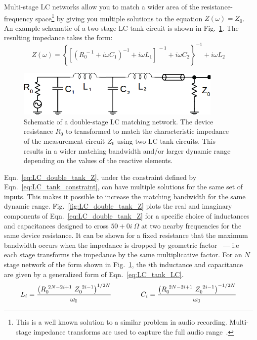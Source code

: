 Multi-stage LC networks allow you to match a wider area of the resistance-frequency space\footnote{This is a well known solution to a similar problem in audio recording. Multi-stage impedance transforms are used to capture the full audio range~\cite{horowitz_art_1989}.} by giving you multiple solutions to the equation $Z(\omega)=Z_0$. An example schematic of a two-stage LC tank circuit is shown in Fig.~\ref{fig:schematic_double_matching}. The resulting impedance takes the form:
\begin{equation}\label{eq:LC_double_tank_Z}
Z(\omega) = \left\lbrace\left[\left(R_0^{~-1}+i\omega C_1\right)^{-1}+i\omega L_1\right]^{~-1}+i\omega C_2\right\rbrace^{-1}+i\omega L_2
\end{equation}
\begin{figure}
\centering
\includegraphics[width=100mm]{figures/Johnson_noise_thermometry/schematic_double_matching}
\caption{Schematic of a double-stage LC matching network. The device resistance $R_0$ to transformed to match the characteristic impedance of the measurement circuit $Z_0$ using two LC tank circuits. This results in a wider matching bandwidth and/or larger dynamic range depending on the values of the reactive elements.}
\label{fig:schematic_double_matching}
\end{figure}
Eqn.~\ref{eq:LC_double_tank_Z}, under the constraint defined by Eqn.~\ref{eq:LC_tank_constraint}, can have multiple solutions for the same set of inputs. This makes it possible to increase the matching bandwidth for the same dynamic range. Fig.~\ref{fig:LC_double_tank_Z} plots the real and imaginary components of Eqn.~\ref{eq:LC_double_tank_Z} for a specific choice of inductances and capacitances designed to cross $50+0i~\Omega$ at two nearby frequencies for the same device resistance. It can be shown for a fixed resistance that the maximum bandwidth occurs when the impedance is dropped by geometric factor~\cite{pozar_microwave_2011} --- i.e each stage transforms the impedance by the same multiplicative factor. For an $N$ stage network of the form shown in Fig.~\ref{fig:schematic_double_matching}, the $i$th inductance and capacitance are given by a generalized form of Eqn.~\ref{eq:LC_tank_LC}. 
\begin{equation}\label{eq:LC_double_tank_LC}
L_i = \frac{\left(R_0^{~2N-2i+1}~Z_0^{~2i-1}\right)^{1/2N}}{\omega_0}
\hspace{15mm}
C_i = \frac{\left(R_0^{~2N-2i+1}~Z_0^{~2i-1}\right)^{-1/2N}}{\omega_0}
\end{equation}
